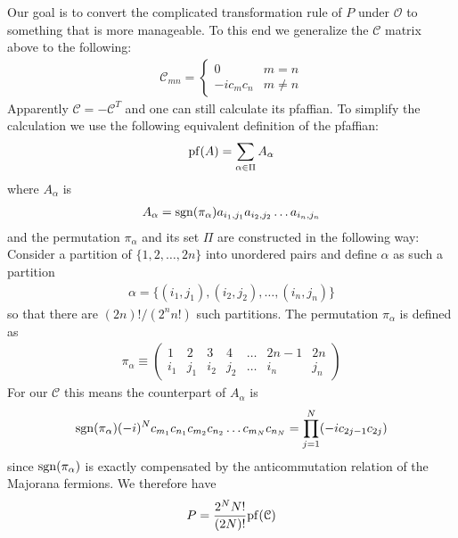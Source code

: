 Our goal is to convert the complicated transformation rule of $P$ under $\mathcal{O}$ to something that is more manageable. To this end we generalize the $\mathcal{C}$ matrix above to the following:
\begin{eqnarray}
	\mathcal{C}_{mn} = \begin{cases}
		0 & m=n\\
		-ic_m c_n & m\neq n
	\end{cases}
\end{eqnarray}
Apparently $\mathcal{C} = -\mathcal{C}^T$ and one can still calculate its pfaffian. To simplify the calculation we use the following equivalent definition of the pfaffian:
\begin{eqnarray}
	{\rm pf} (A) = \sum_{\alpha\in \Pi} A_\alpha
\end{eqnarray}
where $A_\alpha$ is
\begin{eqnarray}
	A_\alpha = {\rm sgn}(\pi_\alpha) a_{i_1,j_1} a_{i_2,j_2}\dots  a_{i_n,j_n}
\end{eqnarray}
and the permutation $\pi_\alpha$ and its set $\Pi$ are constructed in the following way: Consider a partition of $\{1,2,\dots,2n\}$ into unordered pairs and define $\alpha$ as such a partition
\begin{eqnarray}
	\alpha = \{(i_1,j_1),(i_2,j_2),\dots,(i_n,j_n)\}
\end{eqnarray}
so that there are $(2n)!/(2^n n!)$ such partitions. The permutation $\pi_\alpha$ is defined as
\begin{eqnarray}
	\pi_\alpha \equiv \begin{pmatrix}
		1 & 2 & 3 & 4 & \dots & 2n-1 & 2n\\
		i_1 & j_1 & i_2 & j_2 & \dots & i_n & j_n
	\end{pmatrix}
\end{eqnarray}
For our $\mathcal{C}$ this means the counterpart of $A_\alpha$ is
\begin{eqnarray}
	{\rm sgn}(\pi_\alpha) (-i)^N c_{m_1} c_{n_1}c_{m_2} c_{n_2}\dots c_{m_N} c_{n_N} = \prod_{j=1}^N (-ic_{2j-1}c_{2j})
\end{eqnarray}
since ${\rm sgn}(\pi_\alpha)$ is exactly compensated by the anticommutation relation of the Majorana fermions. We therefore have
\begin{eqnarray}
P =\frac{2^N N!}{(2N)!} {\rm pf}(\mathcal{C})
\end{eqnarray}

